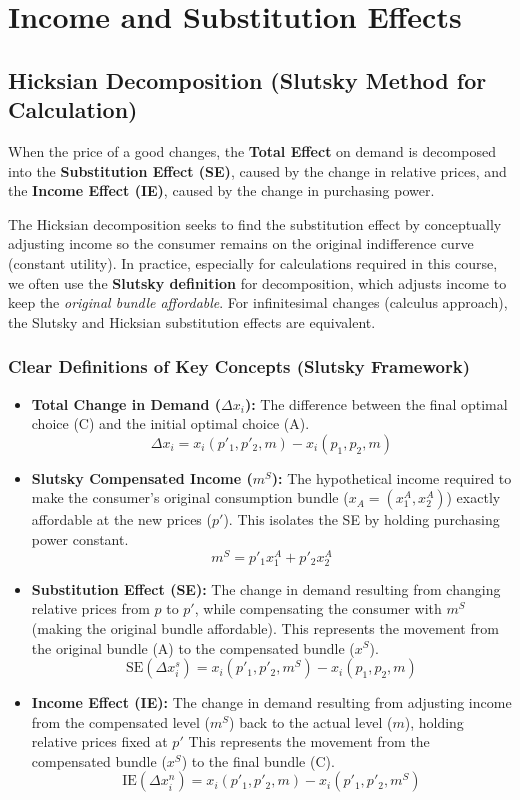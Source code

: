 \documentclass{article}
\begin{document}
\section{Income and Substitution Effects}
\subsection{Hicksian Decomposition (Slutsky Method for Calculation)}

When the price of a good changes, the \textbf{Total Effect} on demand is decomposed into the \textbf{Substitution Effect (SE)}, caused by the change in relative prices, and the \textbf{Income Effect (IE)}, caused by the change in purchasing power.

The Hicksian decomposition seeks to find the substitution effect by conceptually adjusting income so the consumer remains on the original indifference curve (constant utility). In practice, especially for calculations required in this course, we often use the \textbf{Slutsky definition} for decomposition, which adjusts income to keep the \textit{original bundle affordable}. For infinitesimal changes (calculus approach), the Slutsky and Hicksian substitution effects are equivalent.

\subsubsection*{Clear Definitions of Key Concepts (Slutsky Framework)}
\begin{itemize}
	\item \textbf{Total Change in Demand ($\Delta x_i$):} The difference between the final optimal choice (C) and the initial optimal choice (A). \[\Delta x_i = x_i(p'_1, p'_2, m) - x_i(p_1, p_2, m)\]
	\item \textbf{Slutsky Compensated Income ($m^S$):} The hypothetical income required to make the consumer's original consumption bundle ($x_A = (x_1^A, x_2^A)$) exactly affordable at the new prices ($p'$). This isolates the SE by holding purchasing power constant. \[m^S = p'_1 x_1^A + p'_2 x_2^A\]
	\item \textbf{Substitution Effect (SE):} The change in demand resulting from changing relative prices from $p$ to $p'$, while compensating the consumer with $m^S$ (making the original bundle affordable). This represents the movement from the original bundle (A) to the compensated bundle ($x^S$). \[\text{SE} (\Delta x_i^s) = x_i(p'_1, p'_2, m^S) - x_i(p_1, p_2, m)\]
	\item \textbf{Income Effect (IE):} The change in demand resulting from adjusting income from the compensated level ($m^S$) back to the actual level ($m$), holding relative prices fixed at $p'$ This represents the movement from the compensated bundle ($x^S$) to the final bundle (C). \[\text{IE} (\Delta x_i^n) = x_i(p'_1, p'_2, m) - x_i(p'_1, p'_2, m^S)\]
\end{itemize}
\end{document}

